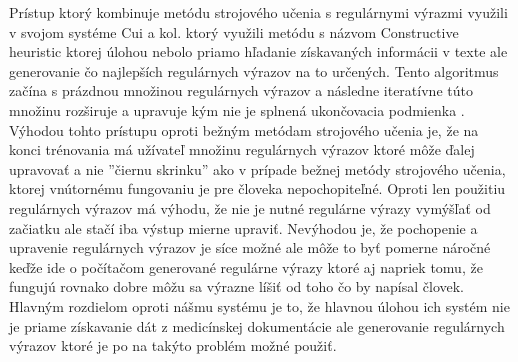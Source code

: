 Prístup ktorý kombinuje metódu strojového učenia 
s regulárnymi výrazmi využili v svojom systéme
Cui a kol. \cite{CHA} ktorý využili metódu s názvom 
Constructive heuristic ktorej úlohou nebolo
priamo hľadanie získavaných informácii v texte ale
generovanie čo najlepších regulárnych výrazov
na to určených. Tento algoritmus začína s
prázdnou množinou regulárnych výrazov a 
následne iteratívne túto množinu rozširuje
a upravuje kým nie je splnená ukončovacia
podmienka \cite{conHeu}. Výhodou tohto prístupu oproti
bežným metódam strojového učenia je, 
že na konci trénovania má užívateľ množinu
regulárnych výrazov ktoré môže ďalej upravovať
a nie ''čiernu skrinku'' ako v prípade bežnej metódy strojového
učenia, ktorej vnútornému fungovaniu je pre človeka
nepochopiteľné. Oproti len použitiu regulárnych výrazov
má výhodu, že nie je nutné regulárne výrazy vymýšľať
od začiatku ale stačí iba výstup mierne upraviť.
Nevýhodou je, že pochopenie a upravenie regulárnych
výrazov je síce možné ale môže to byť pomerne náročné
keďže ide o počítačom generované regulárne výrazy
ktoré aj napriek tomu, že fungujú rovnako dobre môžu
sa výrazne líšiť od toho čo by napísal človek.  
Hlavným rozdielom oproti nášmu systému je to, 
že hlavnou úlohou ich systém nie je priame získavanie
dát z medicínskej dokumentácie ale generovanie 
regulárnych výrazov ktoré je po na takýto problém
možné použiť.

